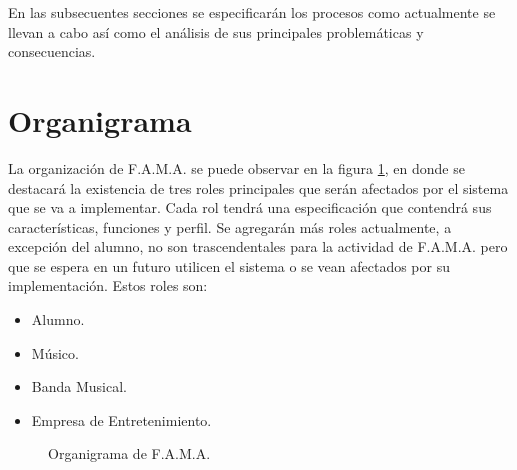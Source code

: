 En las subsecuentes secciones se especificarán los procesos como actualmente se llevan a cabo así como el análisis de sus principales problemáticas y consecuencias.


\section{Organigrama}

La organización de F.A.M.A. se puede observar en la figura \ref{fig:organigrama}, en donde se destacará la existencia de tres roles principales que serán afectados por el sistema que se va a implementar. Cada rol tendrá una especificación que contendrá sus características, funciones y perfil. Se agregarán más roles actualmente, a excepción del alumno, no son trascendentales para la actividad de F.A.M.A. pero que se espera en un futuro utilicen el sistema o se vean afectados por su implementación. Estos roles son:
	\begin{itemize}
		\item Alumno.
		\item Músico.
		\item Banda Musical.
		\item Empresa de Entretenimiento.
	\end{itemize}


\begin{figure}[hbtp!]
	\begin{center}
		\caption{Organigrama de F.A.M.A.}
		\label{fig:organigrama}
	\end{center}
\end{figure}



